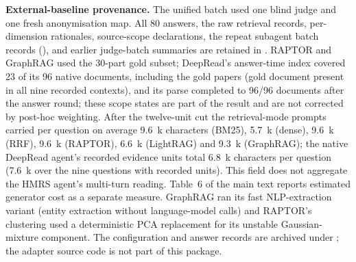 \begin{table}[!t]
\begin{minipage}{\textwidth}
\small
\noindent\textbf{External-baseline provenance.} The unified batch used one
blind judge and one fresh anonymisation map. All 80 answers, the raw retrieval
records, per-dimension rationales, source-scope declarations, the repeat
subagent batch records (), and earlier
judge-batch summaries are retained in
. RAPTOR and GraphRAG used the
30-part gold subset; DeepRead's answer-time index covered 23 of its 96
native documents, including the gold papers (gold document present in all
nine recorded contexts), and its parse completed to 96/96 documents after
the answer round; these scope
states are part of the result and are not corrected by post-hoc weighting.
After the twelve-unit cut the retrieval-mode prompts carried per question
on average 9.6~k characters (BM25), 5.7~k (dense), 9.6~k (RRF), 9.6~k
(RAPTOR), 6.6~k (LightRAG) and 9.3~k (GraphRAG); the native DeepRead
agent's recorded evidence units total 6.8~k characters per question
(7.6~k over the nine questions with recorded units). This field does not
aggregate the HMRS agent's multi-turn reading. Table~6 of the main text
reports estimated generator cost as a separate measure.
GraphRAG ran its fast NLP-extraction variant (entity extraction without
language-model calls) and RAPTOR's clustering used a deterministic PCA
replacement for its unstable Gaussian-mixture component. The configuration
and answer records are archived under
; the adapter source code
is not part of this package.
\end{minipage}
\end{table}

